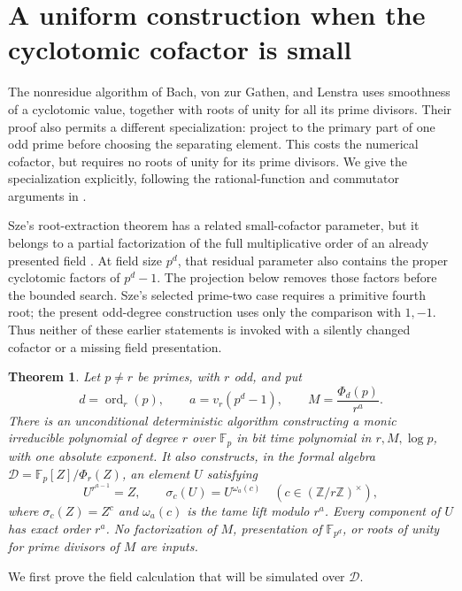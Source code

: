\documentclass[11pt]{article}
\newtheorem{theorem}{Theorem}[section]
\theoremstyle{definition}
\theoremstyle{remark}
\begin{document}
\section{A uniform construction when the cyclotomic cofactor is small}
\label{sec:small-cofactor-lifting}

The nonresidue algorithm of Bach, von zur Gathen, and Lenstra
uses smoothness of a cyclotomic value, together with roots of
unity for all its prime divisors. Their proof also permits a
different specialization: project to the primary part of one
odd prime before choosing the separating element. This costs
the numerical cofactor, but requires no roots of unity for its
prime divisors. We give the specialization explicitly, following
the rational-function and commutator arguments in
\citet[Section~5, author pp.~17--20]{BGL2001}.


Sze's root-extraction theorem has a related small-cofactor parameter,
but it belongs to a partial factorization of the full multiplicative
order of an already presented field
\citep[Definition~2.1 and Theorem~2.2, p.~4]{Sze2011}.
At field size \(p^d\), that residual parameter also contains the
proper cyclotomic factors of \(p^d-1\). The projection below
removes those factors before the bounded search. Sze's selected
prime-two case requires a primitive fourth root; the present
odd-degree construction uses only the comparison with \(1,-1\).
Thus neither of these earlier statements is invoked with a
silently changed cofactor or a missing field presentation.

\begin{theorem}\label{thm:small-cyclotomic-cofactor}
Let \(p\ne r\) be primes, with \(r\) odd, and put
\[
 d=\operatorname{ord}_r(p),\qquad
 a=v_r(p^d-1),\qquad
 M=\frac{\Phi_d(p)}{r^a}.
\]
There is an unconditional deterministic algorithm constructing
a monic irreducible polynomial of degree \(r\) over
\(\mathbb F_p\) in bit time polynomial in \(r,M,\log p\),
with one absolute exponent. It also constructs, in the formal
algebra \(\mathcal D=\mathbb F_p[Z]/\Phi_r(Z)\), an element
\(U\) satisfying
\[
 U^{r^{a-1}}=Z,\qquad
 \sigma_c(U)=U^{\omega_a(c)}
           \quad(c\in(\mathbb Z/r\mathbb Z)^\times),
\]
where \(\sigma_c(Z)=Z^c\) and \(\omega_a(c)\) is the tame
lift modulo \(r^a\). Every component of \(U\) has exact
order \(r^a\). No factorization of \(M\), presentation of
\(\mathbb F_{p^d}\), or roots of unity for prime divisors of
\(M\) are inputs.
\end{theorem}

We first prove the field calculation that will be simulated
over \(\mathcal D\).
\end{document}
